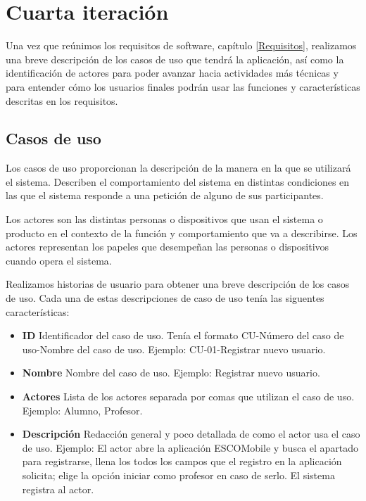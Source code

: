 \newpage
\section{Cuarta iteración}
\noindent
Una vez que reúnimos los requisitos de software, capítulo \ref{Requisitos}, realizamos una breve descripción de los casos de uso que tendrá la aplicación, así como la identificación de actores para poder avanzar hacia actividades más técnicas y para entender cómo los usuarios finales podrán usar las funciones y características descritas en los requisitos.

\subsection{Casos de uso}
\noindent
Los casos de uso proporcionan la descripción de la manera en la que se utilizará el sistema.
Describen el comportamiento del sistema en distintas condiciones en las que el sistema responde a una petición de alguno de sus participantes.

\noindent
Los actores son las distintas personas o dispositivos que usan el sistema o producto en el contexto de la  función y comportamiento que va a describirse. Los actores representan los papeles que desempeñan las personas o dispositivos cuando opera el sistema. \cite{ISPressman}

\noindent
Realizamos historias de usuario para obtener una breve descripción de los casos de uso. Cada una de estas descripciones de caso de uso tenía las siguentes características:
\begin{itemize}
	\item \textbf{ID} Identificador del caso de uso. Tenía el formato CU-Número del caso de uso-Nombre del caso de uso. Ejemplo: CU-01-Registrar nuevo usuario.
	\item \textbf{Nombre} Nombre del caso de uso. Ejemplo: Registrar nuevo usuario.
	\item \textbf{Actores} Lista de los actores separada por comas que utilizan el caso de uso. Ejemplo: Alumno, Profesor.
	\item \textbf{Descripción} Redacción general y poco detallada de como el actor usa el caso de uso. Ejemplo: El actor abre la aplicación ESCOMobile y busca el apartado para registrarse, llena los todos los campos que el registro en la aplicación solicita; elige la opción iniciar como profesor en caso de serlo. El sistema registra al actor.
\end{itemize}

